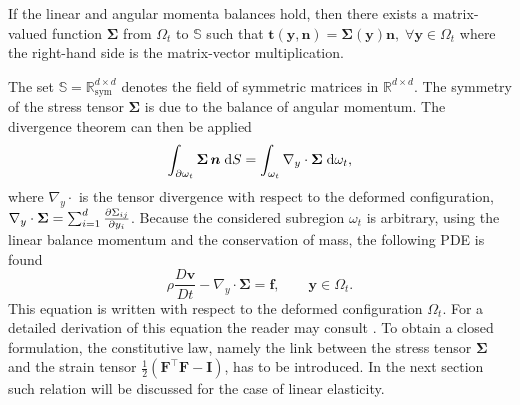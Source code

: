 \begin{theorem}
If the linear and angular momenta balances hold, then there exists a matrix-valued function $\bm{\Sigma}$ from $\Omega_t$ to $\mathbb{S}$ such
that $\bm{t}(\bm{y}, \bm{n}) = \bm{\Sigma}(\bm{y}) \bm{n}, \; \forall \bm{y} \in \Omega_t$ where the right-hand side is the matrix-vector multiplication.
\end{theorem}
The set $\mathbb{S}=\mathbb{R}^{d\times d}_{\mathrm{sym}}$ denotes the field of symmetric matrices in $\mathbb{R}^{d\times d}$. The symmetry of the stress tensor $\bm{\Sigma}$ is due to the balance of angular momentum. The divergence theorem can then be applied
\begin{equation*}
\int_{\partial \omega_t} \bm{\Sigma} \, \bm{n} \d{S} = \int_{\omega_t} \nabla_y \cdot\bm{\Sigma} \d{\omega_t},
\end{equation*}
where $\nabla_y \cdot$ is the tensor divergence with respect to the deformed configuration, $\nabla_y \cdot\bm{\Sigma} = \sum_{i=1}^{d}\diffp{\Sigma_{ij}}{y_i}$.
Because the considered subregion $\omega_t$ is arbitrary, using the linear balance momentum and the conservation of mass, the following PDE is found
\begin{equation*}
	\rho \frac{D\bm{v}}{Dt} - \nabla_y \cdot{\bm{\Sigma}} = \bm{f}, \qquad \bm{y} \in \Omega_t.
\end{equation*}
This equation is written with respect to the deformed configuration $\Omega_t$. For a detailed derivation of this equation the reader may consult \cite[Chapter 4]{abeyaratne2012notes}. To obtain a closed formulation, the constitutive law, namely the link between the stress tensor $\bm{\Sigma}$ and the strain tensor $\frac{1}{2} (\bm{F}^\top \bm{F} - \bm{I})$, has to be introduced. In the next section such relation will be discussed for the case of linear elasticity.

